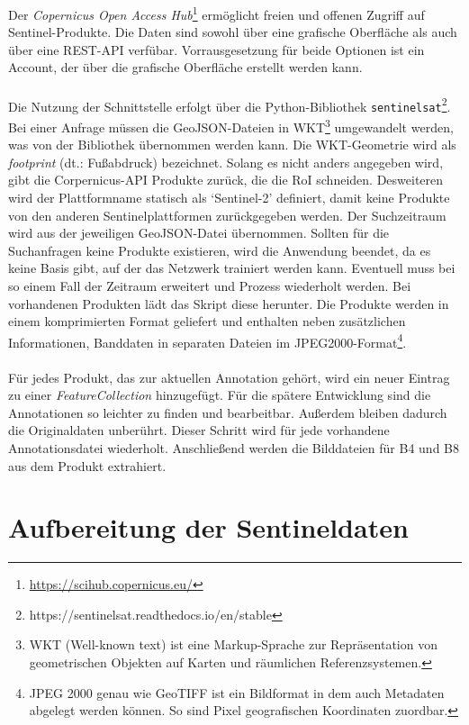 Der \textit{Copernicus Open Access Hub}\footnote{\url{https://scihub.copernicus.eu/}} ermöglicht freien und offenen Zugriff auf Sentinel-Produkte. Die Daten sind sowohl über eine grafische Oberfläche als auch über eine REST-API verfübar. Vorrausgesetzung für beide Optionen ist ein Account, der über die grafische Oberfläche erstellt werden kann.
\\\\
Die Nutzung der Schnittstelle erfolgt über die Python-Bibliothek \texttt{sentinelsat}\footnote{https://sentinelsat.readthedocs.io/en/stable}. Bei einer Anfrage müssen die GeoJSON-Dateien in WKT\footnote{WKT (Well-known text) ist eine Markup-Sprache zur Repräsentation von geometrischen Objekten auf Karten und räumlichen Referenzsystemen.} umgewandelt werden, was von der Bibliothek übernommen werden kann. Die WKT-Geometrie wird als \textit{footprint} (dt.: Fußabdruck) bezeichnet. Solang es nicht anders angegeben wird, gibt die Corpernicus-API Produkte zurück, die die RoI schneiden. Desweiteren wird der Plattformname statisch als `Sentinel-2' definiert, damit keine Produkte von den anderen Sentinelplattformen zurückgegeben werden. Der Suchzeitraum wird aus der jeweiligen GeoJSON-Datei übernommen. Sollten für die Suchanfragen keine Produkte existieren, wird die Anwendung beendet, da es keine Basis gibt, auf der das Netzwerk trainiert werden kann. Eventuell muss bei so einem Fall der Zeitraum erweitert und Prozess wiederholt werden. Bei vorhandenen Produkten lädt das Skript diese herunter. Die Produkte werden in einem komprimierten Format geliefert und enthalten neben zusätzlichen Informationen, Banddaten in separaten Dateien im JPEG2000-Format\footnote{JPEG 2000 genau wie GeoTIFF ist ein Bildformat in dem auch Metadaten abgelegt werden können. So sind Pixel geografischen Koordinaten zuordbar.}.
\\\\
Für jedes Produkt, das zur aktuellen Annotation gehört, wird ein neuer Eintrag zu einer \textit{FeatureCollection} hinzugefügt. Für die spätere Entwicklung sind die Annotationen so leichter zu finden und bearbeitbar. Außerdem bleiben dadurch die Originaldaten unberührt. Dieser Schritt wird für jede vorhandene Annotationsdatei wiederholt. Anschließend werden die Bilddateien für B4 und B8 aus dem Produkt extrahiert.



\section{Aufbereitung der Sentineldaten}

